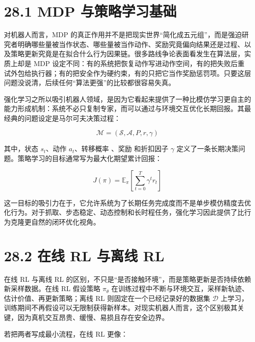 \section*{28.1 MDP 与策略学习基础}


对机器人而言，MDP 的真正作用并不是把现实世界“简化成五元组”，而是强迫研究者明确哪些量被当作状态、哪些量被当作动作、奖励究竟偏向结果还是过程、以及策略更新究竟是在拟合什么行为因果链。很多路线争论表面看发生在算法层，实质上却是 MDP 设定不同：有的系统把恢复动作写进动作空间，有的把失败后重试外包给执行器；有的把安全作为硬约束，有的只把它当作奖励惩罚项。只要这层问题没说清，后续任何“算法更强”的比较都很容易失真。

强化学习之所以吸引机器人领域，是因为它看起来提供了一种比模仿学习更自主的能力形成机制：系统不必只复制专家，而可以通过与环境交互优化长期回报。其最经典的问题设定是马尔可夫决策过程：

\begin{equation*}
\mathcal{M} = (\mathcal{S}, \mathcal{A}, P, r, \gamma)
\end{equation*}

其中，状态 \(s_t\)、动作 \(a_t\)、转移概率 \texttt{}、奖励 \texttt{} 和折扣因子 \(\gamma\) 定义了一条长期决策问题。策略学习的目标通常写为最大化期望累计回报：

\begingroup
\footnotesize
\begin{equation*}
J(\pi) = \mathbb{E}_{\pi}\left[\sum_{t=0}^{T} \gamma^t r_t \right]
\end{equation*}
\endgroup

这一目标的吸引力在于，它允许系统为了长期任务完成度而不是单步模仿精度去优化行为。对于抓取、步态稳定、动态控制和长时程任务，强化学习因此提供了比行为克隆更自然的闭环优化视角。

\section*{28.2 在线 RL 与离线 RL}


在线 RL 与离线 RL 的区别，不只是“是否接触环境”，而是策略更新是否持续依赖新采样数据。在线 RL 假设策略 \(\pi_\theta\) 在训练过程中不断与环境交互，采样新轨迹、估计价值、再更新策略；离线 RL 则固定在一个已经记录好的数据集 \(\mathcal{D}\) 上学习，训练期间不再假设可以无限制获得新样本。对现实机器人而言，这个区别极其关键，因为真机交互昂贵、缓慢、易损且存在安全边界。

若把两者写成最小流程，在线 RL 更像：


